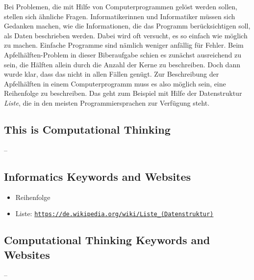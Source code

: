 \documentclass[a4paper,11pt]{report}
\newcommand{\BrochureUrlText}[1]{\texttt{#1}}
\begin{document}
Bei Problemen, die mit Hilfe von Computerprogrammen gelöst werden sollen, stellen sich ähnliche Fragen. Informatikerinnen und Informatiker müssen sich Gedanken machen, wie die Informationen, die das Programm berücksichtigen soll, als Daten beschrieben werden.  Dabei wird oft versucht, es so einfach wie möglich zu machen.  Einfache Programme sind nämlich weniger anfällig für Fehler.  Beim Apfelhälften-Problem in dieser Biberaufgabe schien es zunächst ausreichend zu sein, die Hälften allein durch die Anzahl der Kerne zu beschreiben.  Doch dann wurde klar, dass das nicht in allen Fällen genügt.  Zur Beschreibung der Apfelhälften in einem Computerprogramm muss es also möglich sein, eine Reihenfolge zu beschreiben.  Das geht zum Beispiel mit Hilfe der Datenstruktur \emph{Liste}, die in den meisten Programmiersprachen zur Verfügung steht.


\subsection*{This is Computational Thinking}

–


\subsection*{Informatics Keywords and Websites}

\begin{itemize}
  \item Reihenfolge
  \item Liste: \href{https://de.wikipedia.org/wiki/Liste_(Datenstruktur)}{\BrochureUrlText{https://de.wikipedia.org/wiki/Liste\_(Datenstruktur)}}
\end{itemize}


\subsection*{Computational Thinking Keywords and Websites}

–
\end{document}

